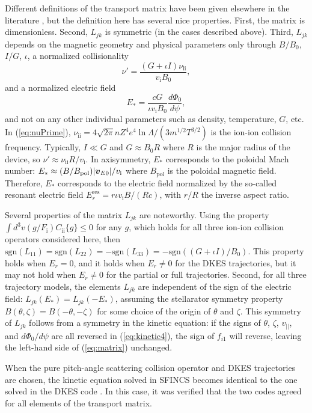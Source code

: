 \documentclass[12pt]{revtex4}
\newcommand{\vect}[1]{\mbox{\boldmath $#1$}}
\newcommand{\vEo}{\vect{v}_{E0}}
\newcommand{\vi}{v_{\mathrm{i}}}
\newcommand{\nuii}{\nu_{\mathrm{ii}}}
\newcommand{\sgn}{\mathrm{sgn}}
\newcommand{\Erres}{E_r^{\mathrm{res}}}
\newcommand{\Bpol}{B_{\mathrm{pol}}}
\begin{document}
Different definitions of the transport matrix have been given elsewhere in the literature \cite{Beidler},
but the definition here has several nice properties. First, the matrix is dimensionless. Second, $L_{jk}$ is symmetric (in the cases described above).
Third, $L_{jk}$ depends on the magnetic geometry and physical parameters only through
$B/B_0$, $I/G$, $\iota$, a normalized collisionality
\begin{equation}
\nu' = \frac{(G+\iota I)\nuii}{\vi B_0},
\label{eq:nuPrime}
\end{equation}
and a normalized electric field
\begin{equation}
E_* = \frac{c G}{\iota \vi B_0}\frac{d\Phi_0}{d\psi},
\label{eq:EStar}
\end{equation}
and not on any other individual parameters such as density, temperature, $G$, etc.
In (\ref{eq:nuPrime}), $\nuii = 4\sqrt{2\pi} n Z^4 e^4 \ln\Lambda/(3 m^{1/2} T^{3/2})$
is the ion-ion collision frequency.
Typically, $I \ll G$ and $G \approx B_0 R$ where $R$ is the major radius of the device,
so $\nu' \approx \nuii R / \vi$.
In axisymmetry, $E_*$ corresponds to the poloidal Mach number: $E_* \approx (B / \Bpol) | \vEo | / \vi$
where $\Bpol$ is the poloidal magnetic field.
Therefore, $E_*$ corresponds to the electric field normalized by the so-called resonant electric field \cite{Beidler}
$\Erres = r\iota \vi B/(R c)$, with $r/R$ the inverse aspect ratio.

Several properties of the matrix $L_{jk}$ are noteworthy. Using the property $\int d^3v (g/F_{\mathrm{i}}) C_{\mathrm{ii}}\{g\} \le 0$
for any $g$, which holds for all three ion-ion collision operators considered here,
then $\sgn(L_{11}) = \sgn(L_{22}) = -\sgn(L_{33}) = -\sgn((G+\iota I)/B_0)$.
This property holds when $E_r=0$, and it holds when $E_r \ne 0$ for the DKES trajectories, but it
may not hold when $E_r \ne 0$ for the partial or full trajectories.
Second, for all three trajectory models, the elements $L_{jk}$
are independent of the sign of the electric field: $L_{jk}(E_*) = L_{jk}(-E_*)$,
assuming the stellarator symmetry property $B(\theta,\zeta) = B(-\theta,-\zeta)$
for some choice of the origin of $\theta$ and $\zeta$.
This symmetry of $L_{jk}$ follows from a symmetry in the kinetic equation:
if the signs of 
$\theta$, $\zeta$, $v_{||}$, and $d\Phi_0/d\psi$ are all reversed
in (\ref{eq:kinetic4}), the sign of $f_{i1}$ will reverse,
leaving the left-hand side of (\ref{eq:matrix}) unchanged.

When the pure pitch-angle scattering collision operator 
and DKES trajectories are chosen, the kinetic equation
solved in SFINCS becomes identical to the one solved in the DKES code \cite{DKES1, DKES2}.
In this case, it was verified that the two codes agreed for all elements of the transport
matrix.
\end{document}
